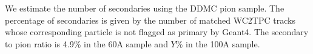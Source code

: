 



We estimate the number of secondaries using the DDMC pion sample.  The percentage of secondaries is given by the number of matched WC2TPC tracks whose corresponding particle is not flagged as primary by Geant4.  The secondary to pion ratio is 4.9\% in the 60A sample and $Y$\% in the 100A sample.

